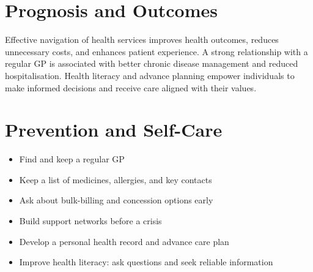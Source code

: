 \section*{Prognosis and Outcomes}
Effective navigation of health services improves health outcomes, reduces unnecessary costs, and enhances patient experience. A strong relationship with a regular GP is associated with better chronic disease management and reduced hospitalisation. Health literacy and advance planning empower individuals to make informed decisions and receive care aligned with their values.

\section*{Prevention and Self-Care}
\begin{itemize}
    \item Find and keep a regular GP
    \item Keep a list of medicines, allergies, and key contacts
    \item Ask about bulk-billing and concession options early
    \item Build support networks before a crisis
    \item Develop a personal health record and advance care plan
    \item Improve health literacy: ask questions and seek reliable information
\end{itemize}
